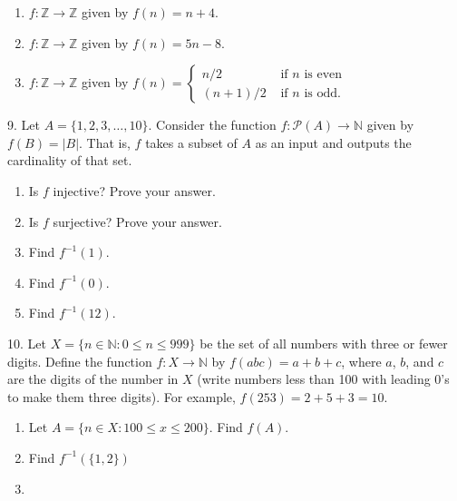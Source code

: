 \documentclass[10pt,]{book}
\theoremstyle{plain}
\theoremstyle{definition}
\theoremstyle{definition}
\numberwithin{equation}{chapter}
\newcommand{\N}{\mathbb N}
\newcommand{\Z}{\mathbb Z}
\newcommand{\pow}{\mathcal P}
\newcommand{\inv}{^{-1}}
\newcommand{\st}{:}
\newcommand{\amp}{&}
\begin{document}
\begin{exerciselist}
\begin{enumerate}[label=(\alph*)]
\item\hypertarget{li-460}{}\(f:\Z \to \Z\) given by \(f(n) = n+4\).%
\item\hypertarget{li-461}{}\(f:\Z \to \Z\) given by \(f(n) = 5n - 8\).%
\item\hypertarget{li-462}{}\(f:\Z \to \Z\) given by \(f(n) = \begin{cases}n/2 \amp  \text{ if } n \text{ is even} \\ (n+1)/2 \amp \text{ if } n \text{ is odd} . \end{cases}\)%
\end{enumerate}
%
\par\smallskip
\item[9.]\hypertarget{exercise-55}{}\hypertarget{p-722}{}%
Let \(A = \{1,2,3,\ldots,10\}\). Consider the function \(f:\pow(A) \to \N\) given by \(f(B) = |B|\). That is, \(f\) takes a subset of \(A\) as an input and outputs the cardinality of that set. \leavevmode%
\begin{enumerate}[label=(\alph*)]
\item\hypertarget{li-467}{}\hypertarget{p-723}{}%
Is \(f\) injective? Prove your answer.%
\item\hypertarget{li-468}{}\hypertarget{p-724}{}%
Is \(f\) surjective? Prove your answer.%
\item\hypertarget{li-469}{}\hypertarget{p-725}{}%
Find \(f\inv(1)\).%
\item\hypertarget{li-470}{}\hypertarget{p-726}{}%
Find \(f\inv(0)\).%
\item\hypertarget{li-471}{}\hypertarget{p-727}{}%
Find \(f\inv(12)\).%
\end{enumerate}
%
\par\smallskip
\item[10.]\hypertarget{exercise-56}{}\hypertarget{p-734}{}%
Let \(X = \{n \in \N \st 0 \le n \le 999\}\) be the set of all numbers with three or fewer digits. Define the function \(f:X \to \N\) by \(f(abc) = a+b+c\), where \(a\), \(b\), and \(c\) are the digits of the number in \(X\) (write numbers less than 100 with leading 0's to make them three digits). For example, \(f(253) = 2 + 5 + 3 =  10\). \leavevmode%
\begin{enumerate}[label=(\alph*)]
\item\hypertarget{li-477}{}\hypertarget{p-735}{}%
Let \(A = \{n \in X \st 100 \le x \le 200\}\).  Find \(f(A)\).%
\item\hypertarget{li-478}{}\hypertarget{p-736}{}%
Find \(f\inv(\{1,2\})\)%
\item\hypertarget{li-479}{}\hypertarget{p-737}{}%

\end{enumerate}
\end{exerciselist}
\end{document}
